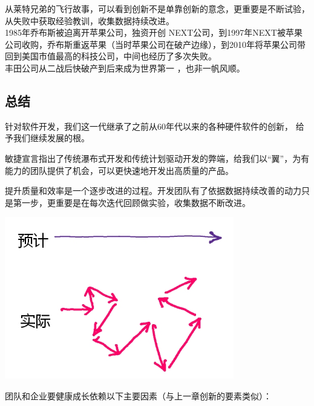 从莱特兄弟的飞行故事，可以看到创新不是单靠创新的意念，更重要是不断试验，从失败中获取经验教训，收集数据持续改进。\\
1985年乔布斯被迫离开苹果公司，独资开创 NEXT公司，到1997年NEXT被苹果公司收购，乔布斯重返苹果（当时苹果公司在破产边缘），到2010年将苹果公司带回到美国市值最高的科技公司，中间也经历了多次失败。\\
丰田公司从二战后快破产到后来成为世界第一 ，也非一帆风顺。\\

\hypertarget{ux603bux7ed3}{%
\subsection{总结}\label{ux603bux7ed3}}

针对软件开发，我们这一代继承了之前从60年代以来的各种硬件软件的创新，
给予我们继续发展的根。

敏捷宣言指出了传统瀑布式开发和传统计划驱动开发的弊端，给我们以``翼''，为有能力的团队提供了机会，可以更快速地开发出高质量的产品。

提升质量和效率是一个逐步改进的过程。开发团队有了依据数据持续改善的动力只是第一步，更重要是在每次迭代回顾做实验，收集数据不断改进。

\includegraphics[width=10cm]{ch26.jpg}

团队和企业要健康成长依赖以下主要因素（与上一章创新的要素类似）：

